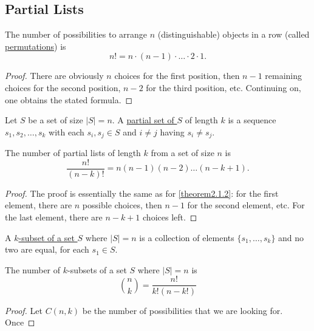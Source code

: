 \documentclass[11pt]{article}
\begin{document}
\begin{titlepage}
\subsection{Partial Lists}
\begin{theorem} \label{theorem2.1.2}
	The number of possibilities to arrange $n$ (distinguishable) objects in a
	row (called \underline{permutations}) is
	\begin{equation*}
		n! = n \cdot (n-1) \cdot \dots \cdot 2 \cdot 1.
	\end{equation*}
\end{theorem}
\begin{proof}
	There are obviously $n$ choices for the first position, then $n-1$ remaining
	choices for the second position, $n-2$ for the third position, etc.
	Continuing on, one obtains the stated formula.
\end{proof}
\begin{definition}
	Let $S$ be a set of size $|S| = n$. A \underline{partial set of $S$} of
	length $k$ is a sequence $s_1, s_2, \dots, s_k$ with each $s_i, s_j \in S$
	and $i \neq j$ having $s_i \neq s_j$.
\end{definition}
\begin{theorem} \label{theorem2.1.3}
	The number of partial lists of length $k$ from a set of size $n$ is
	\begin{equation*}
		\frac{n!}{(n-k)!} = n(n-1)(n-2)\dots (n-k+1).
	\end{equation*}
\end{theorem}
\begin{proof}
	The proof is essentially the same as for \cref{theorem2.1.2}: for the first
	element, there are $n$ possible choices, then $n-1$ for the second
	element, etc. For the last element, there are $n-k+1$ choices left.
\end{proof}
\begin{definition}
	A \underline{$k$-subset of a set $S$} where $|S| = n$ is a
	collection of elements $\{s_1, \dots, s_k\}$ and no two are equal, for each
	$s_1 \in S$.
\end{definition}
\begin{theorem} \label{theorem2.1.4}
The number of $k$-subsets of a set $S$ where $|S| = n$ is
\begin{equation*}
	\binom{n}{k} = \frac{n!}{k!(n-k!)}
\end{equation*}
\end{theorem}
\begin{proof}
	Let $C(n,k)$ be the number of possibilities that we are looking for. Once

\end{proof}
\end{titlepage}
\end{document}
